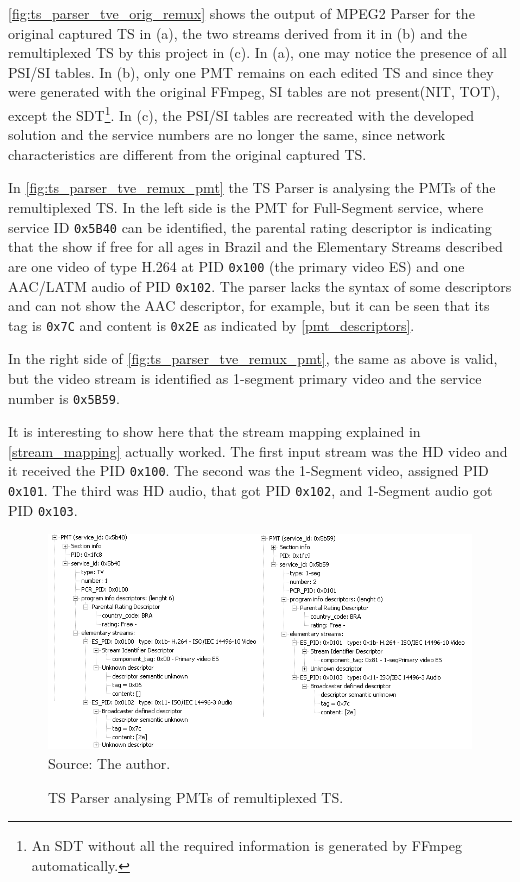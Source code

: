 \documentclass[
	12pt,				%
	openright,			%
	twoside,			%
	a4paper,			%
	brazil,
	french,				%
	english
	]{abntex2}
\begin{document}
\autoref{fig:ts_parser_tve_orig_remux} shows the output of MPEG2 Parser for the original captured TS in (a), the two streams derived from it in (b) and the remultiplexed TS by this project in (c). In (a), one may notice the presence of all PSI/SI tables. In (b), only one PMT remains on each edited TS and since they were generated with the original FFmpeg, SI tables are not present(NIT, TOT), except the SDT\footnote{An SDT without all the required information is generated by FFmpeg automatically.}. In (c), the PSI/SI tables are recreated with the developed solution and the service numbers are no longer the same, since network characteristics are different from the original captured TS.

In \autoref{fig:ts_parser_tve_remux_pmt} the TS Parser is analysing the PMTs of the remultiplexed TS. In the left side is the PMT for Full-Segment service, where service ID \texttt{0x5B40} can be identified, the parental rating descriptor is indicating that the show if free for all ages in Brazil and the Elementary Streams described are one video of type H.264 at PID \texttt{0x100} (the primary video ES) and one AAC/LATM audio of PID \texttt{0x102}. The parser lacks the syntax of some descriptors and can not show the AAC descriptor, for example, but it can be seen that its tag is \texttt{0x7C} and content is \texttt{0x2E} as indicated by \autoref{pmt_descriptors}.

In the right side of \autoref{fig:ts_parser_tve_remux_pmt}, the same as above is valid, but the video stream is identified as 1-segment primary video and the service number is \texttt{0x5B59}.

It is interesting to show here that the stream mapping explained in \autoref{stream_mapping} actually worked. The first input stream was the HD video and it received the PID \texttt{0x100}. The second was the 1-Segment video, assigned PID \texttt{0x101}. The third was HD audio, that got PID \texttt{0x102}, and 1-Segment audio got PID \texttt{0x103}.

\begin{figure}[!h]
\centering
\caption{TS Parser analysing PMTs of remultiplexed TS.}
\includegraphics[width=0.9\linewidth]{figuras/ts_parser_tve_remux_pmt.png}
\\Source: The author.
\label{fig:ts_parser_tve_remux_pmt}
\end{figure}
\end{document}
